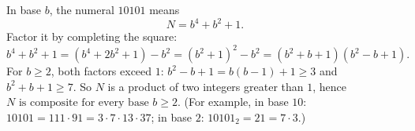 In base $b$, the numeral $10101$ means
\[
N=b^4+b^2+1 .
\]
Factor it by completing the square:
\[
b^4+b^2+1=\left(b^4+2b^2+1\right)-b^2=\left(b^2+1\right)^2-b^2=\left(b^2+b+1\right)\left(b^2-b+1\right).
\]
For $b\ge2$, both factors exceed $1$: $b^2-b+1=b(b-1)+1\ge3$ and $b^2+b+1\ge7$. So $N$ is a product of two integers greater than $1$, hence $\boxed{N\text{ is composite for every base }b\ge2}$. (For example, in base $10$: $10101=111\cdot91=3\cdot7\cdot13\cdot37$; in base $2$: $10101_2=21=7\cdot3$.)
